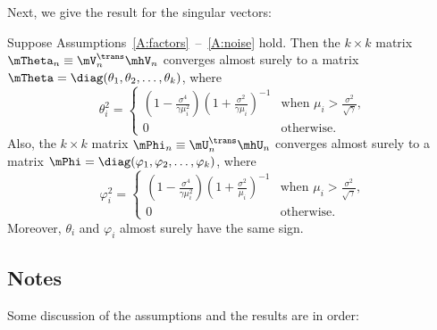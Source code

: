 Next, we give the result for the singular vectors:
\begin{theorem}\label{T:spiked-eigenvector-limits}
    Suppose Assumptions~\ref{A:factors}~--~\ref{A:noise} hold.  Then the
    $k\times k$ matrix $\mTheta_n \equiv \mV_n^\trans \mhV_n$ converges almost 
    surely to a matrix 
    $\mTheta = \diag(\theta_1, \theta_2, \ldots, \theta_k)$, where
    \begin{equation}
        \theta_i^2
        =
        \begin{cases}
            \left( 1 - \frac{\sigma^4}{ \gamma \mu_i^2} \right)
            \left( 1 + \frac{\sigma^2}{ \gamma \mu_i  } \right)^{-1}
            &\text{when $\mu_i > \frac{\sigma^2}{\sqrt{\gamma}}$,} \\
            0
            &\text{otherwise.}
        \end{cases}
    \end{equation}
    Also, the $k\times k$ matrix $\mPhi_n \equiv \mU_n^\trans \mhU_n$
    converges almost surely to a matrix
    $\mPhi = \diag(\varphi_1, \varphi_2, \ldots, \varphi_k)$, where    
    \begin{equation}
        \varphi_i^2
        =
        \begin{cases}
            \left( 1 - \frac{\sigma^4}{ \gamma \mu_i^2} \right)
            \left( 1 + \frac{\sigma^2}{ \mu_i  } \right)^{-1}
            &\text{when $\mu_i > \frac{\sigma^2}{\sqrt{\gamma}}$,} \\
            0
            &\text{otherwise.}
        \end{cases}
    \end{equation}
    Moreover, $\theta_i$ and $\varphi_i$ almost surely have the same
    sign.
\end{theorem}


\subsection{Notes}

Some discussion of the assumptions and the results are in order:

